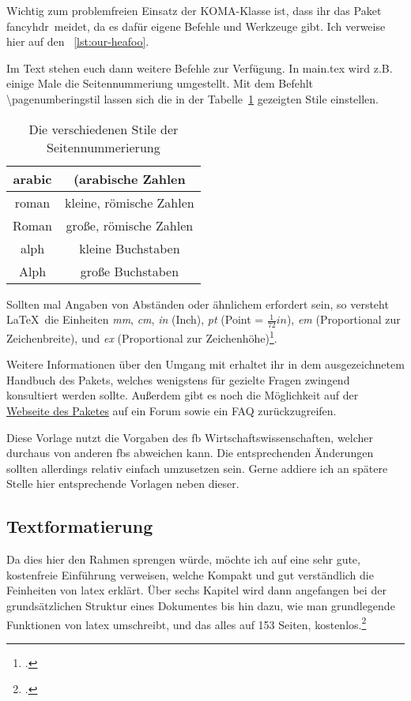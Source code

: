 Wichtig zum problemfreien Einsatz der KOMA-Klasse ist, dass ihr das Paket \glqq fancyhdr\grqq\ meidet, da es dafür eigene Befehle und Werkzeuge gibt. Ich verweise hier auf den ~\ref{lst:our-heafoo}.



Im Text stehen euch dann weitere Befehle zur Verfügung. In main.tex wird z.B. einige Male die Seitennummeriung umgestellt. Mit dem Befehlt \textbackslash pagenumberingstil lassen sich die in der Tabelle~\ref{tab:pgnumb} gezeigten Stile einstellen.

\begin{table}[htpb]
  \centering
  \begin{tabular}{|c|c|}
    \hline
    arabic & (arabische Zahlen \\ \hline
    roman & kleine, römische Zahlen \\ \hline
    Roman & große, römische Zahlen \\ \hline
    alph & kleine Buchstaben \\ \hline
    Alph & große Buchstaben \\ \hline
  \end{tabular}
  \caption{Die verschiedenen Stile der Seitennummerierung}
  \label{tab:pgnumb}
\end{table}

Sollten mal Angaben von Abständen oder ähnlichem erfordert sein, so versteht \LaTeX{}\ die Einheiten \emph{mm}, \emph{cm}, \emph{in} (Inch), \emph{pt} (Point = $\frac{1}{72} in$), \emph{em} (Proportional zur Zeichenbreite), und \emph{ex} (Proportional zur Zeichenhöhe)\footcite[Vgl. ][S. 5]{riedel_latex_2011}.

Weitere Informationen über den Umgang mit  erhaltet ihr in dem ausgezeichnetem Handbuch des Pakets, welches wenigstens für gezielte Fragen zwingend konsultiert werden sollte. Außerdem gibt es noch die Möglichkeit auf der \href{https://komascript.de/}{Webseite des Paketes} auf ein Forum sowie ein FAQ zurückzugreifen.

Diese Vorlage nutzt die Vorgaben des \gls{fb} Wirtschaftswissenschaften, welcher durchaus von anderen \glspl{fb} abweichen kann. Die entsprechenden Änderungen sollten allerdings relativ einfach umzusetzen sein. Gerne addiere ich an spätere Stelle hier entsprechende Vorlagen neben dieser.%
\subsection{Textformatierung}%
\label{sec:textformat}
Da dies hier den Rahmen sprengen würde, möchte ich auf eine sehr gute, kostenfreie Einführung verweisen, welche Kompakt und gut verständlich die Feinheiten von \gls{latex} erklärt. Über sechs Kapitel wird dann angefangen bei der grundsätzlichen Struktur eines Dokumentes bis hin dazu, wie man grundlegende Funktionen von \gls{latex} umschreibt, und das alles auf 153 Seiten, kostenlos.\footcite{oetiker_not_2018}

